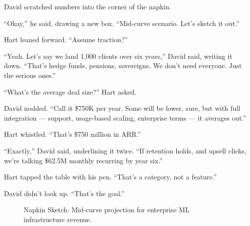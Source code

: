 \medskip

David scratched numbers into the corner of the napkin.

``Okay,'' he said, drawing a new box. ``Mid-curve scenario. Let’s sketch it out.''

Hart leaned forward. ``Assume traction?''

``Yeah. Let’s say we land 1,000 clients over six years,'' David said, writing it down.
``That’s hedge funds, pensions, sovereigns. We don’t need everyone. Just the serious ones.''

``What’s the average deal size?'' Hart asked.

David nodded. ``Call it \$750K per year. Some will be lower, sure, but with full integration --- 
support, usage-based scaling, enterprise terms --- it averages out.''

Hart whistled. ``That’s \$750 million in ARR.''

``Exactly,'' David said, underlining it twice. ``If retention holds, and upsell clicks, we’re talking 
\$62.5M monthly recurring by year six.''

Hart tapped the table with his pen. ``That’s a category, not a feature.''

David didn’t look up. ``That’s the goal.''

\medskip

\begin{figure}[H]
    \centering
    \caption{Napkin Sketch: Mid-curve projection for enterprise ML infrastructure revenue.}
\end{figure}

